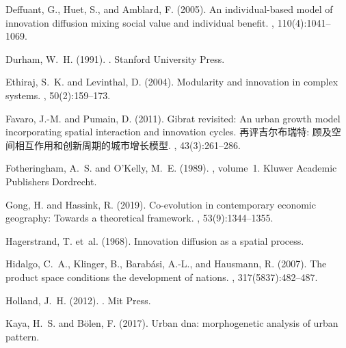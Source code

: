 \documentclass[letterpaper]{article}
\begin{document}
\begin{thebibliography}{}
Deffuant, G., Huet, S., and Amblard, F. (2005).
\newblock An individual-based model of innovation diffusion mixing social value
  and individual benefit.
, 110(4):1041--1069.

Durham, W.~H. (1991).
.
\newblock Stanford University Press.

Ethiraj, S.~K. and Levinthal, D. (2004).
\newblock Modularity and innovation in complex systems.
, 50(2):159--173.

Favaro, J.-M. and Pumain, D. (2011).
\newblock Gibrat revisited: An urban growth model incorporating spatial
  interaction and innovation cycles. 再评吉尔布瑞特:
  顾及空间相互作用和创新周期的城市增长模型.
, 43(3):261--286.

Fotheringham, A.~S. and O'Kelly, M.~E. (1989).
,
  volume~1.
\newblock Kluwer Academic Publishers Dordrecht.

Gong, H. and Hassink, R. (2019).
\newblock Co-evolution in contemporary economic geography: Towards a
  theoretical framework.
, 53(9):1344--1355.

Hagerstrand, T. et~al. (1968).
\newblock Innovation diffusion as a spatial process.

Hidalgo, C.~A., Klinger, B., Barab{\'a}si, A.-L., and Hausmann, R. (2007).
\newblock The product space conditions the development of nations.
, 317(5837):482--487.

Holland, J.~H. (2012).
.
\newblock Mit Press.

Kaya, H.~S. and B{\"o}len, F. (2017).
\newblock Urban dna: morphogenetic analysis of urban pattern.


\end{thebibliography}
\end{document}
